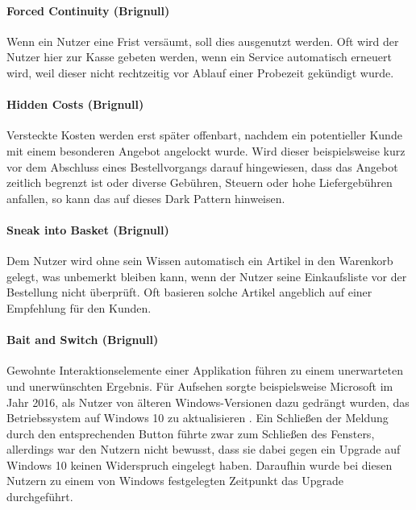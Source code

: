 \documentclass[a4paper]{article}
\begin{document}
\paragraph{Forced Continuity (Brignull)}
\label{para:forced_continuity}
Wenn ein Nutzer eine Frist versäumt, soll dies ausgenutzt werden. Oft wird der Nutzer hier zur Kasse gebeten werden, wenn ein Service automatisch erneuert wird, weil dieser nicht rechtzeitig vor Ablauf einer Probezeit gekündigt wurde.

\paragraph{Hidden Costs (Brignull)} 
\label{para:hidden_costs}
Versteckte Kosten werden erst später offenbart, nachdem ein potentieller Kunde mit einem besonderen Angebot angelockt wurde. Wird dieser beispielsweise kurz vor dem Abschluss eines Bestellvorgangs darauf hingewiesen, dass das Angebot zeitlich begrenzt ist oder diverse Gebühren, Steuern oder hohe Liefergebühren anfallen, so kann das auf dieses Dark Pattern hinweisen. 

\paragraph{Sneak into Basket (Brignull)}
\label{para:sneak_into_basket}
Dem Nutzer wird ohne sein Wissen automatisch ein Artikel in den Warenkorb gelegt, was unbemerkt bleiben kann, wenn der Nutzer seine Einkaufsliste vor der Bestellung nicht überprüft. Oft basieren solche Artikel angeblich auf einer Empfehlung für den Kunden.

\paragraph{Bait and Switch (Brignull)}
\label{para:bait_and_switch}
Gewohnte Interaktionselemente einer Applikation führen zu einem unerwarteten und unerwünschten Ergebnis. 
Für Aufsehen sorgte beispielsweise Microsoft im Jahr 2016, als Nutzer von älteren Windows-Versionen dazu gedrängt wurden, das Betriebssystem auf Windows 10 zu aktualisieren \cite{thurrott}. Ein Schließen der Meldung durch den entsprechenden Button führte zwar zum Schließen des Fensters, allerdings war den Nutzern nicht bewusst, dass sie dabei gegen ein Upgrade auf Windows 10 keinen Widerspruch eingelegt haben. Daraufhin wurde bei diesen Nutzern zu einem von Windows festgelegten Zeitpunkt das Upgrade durchgeführt. 
\end{document}
